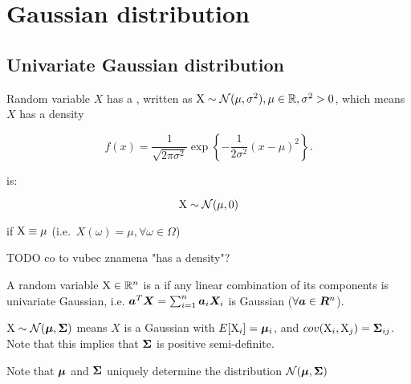 \chapter{Gaussian distribution}


\section{Univariate Gaussian distribution}

\begin{defn}
    Random variable $X$ has a , written as ${\textnormal{X}} \sim {\mathcal{N}}(\mu, \sigma^2), \mu \in {\mathbb{R}}, \sigma^2 > 0$, which means $X$ has a density
    
    \begin{equation}
        f(x) = \frac{1}{\sqrt{2 \pi \sigma^2}} \exp{ \left\{ -\frac{1}{2\sigma^2} (x - \mu)^2 \right\}}.
    \end{equation}
\end{defn}

\begin{defn}
     is:
    
    \begin{equation}
        {\textnormal{X}} \sim {\mathcal{N}}(\mu, 0)
    \end{equation}
    
    if ${\textnormal{X}} \equiv \mu$ (i.e.\ $X(\omega) = \mu, \forall \omega \in \Omega$)
\end{defn}

\begin{defn}
    {TODO co to vubec znamena "has a density"?}
    
    A random variable ${\textnormal{X}} \in {\mathbb{R}}^n$ is a  if any linear combination of its components is univariate Gaussian, i.e. ${\bm{a}}^T {\bm{X}} = \sum_{i=1}^n {\bm{a}}_i {\bm{X}}_i$ is Gaussian ($\forall {\bm{a}} \in {\bm{R}}^n$).
\end{defn}

\begin{defn}
    ${\textnormal{X}} \sim {\mathcal{N}}({\bm{\mu}}, {\bm{\Sigma}})$ means $X$ is a Gaussian with $E[{\textnormal{X}}_i] = {\bm{\mu}}_i$, and $cov({\textnormal{X}}_i, {\textnormal{X}}_j) = {\bm{\Sigma}}_{ij}$. Note that this implies that ${\bm{\Sigma}}$ is positive semi-definite.
\end{defn}

\begin{rem}
    Note that ${\bm{\mu}}$ and ${\bm{\Sigma}}$ uniquely determine the distribution ${\mathcal{N}}({\bm{\mu}}, {\bm{\Sigma}})$
\end{rem}

